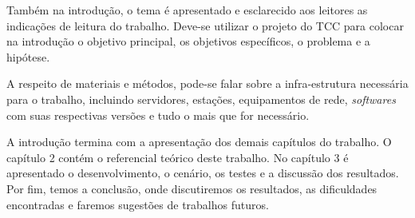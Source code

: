 Também na introdução, o tema é apresentado e esclarecido aos leitores as indicações de leitura do trabalho. Deve-se utilizar o projeto do TCC para colocar na introdução o objetivo principal, os objetivos específicos, o problema e a hipótese.

A respeito de materiais e métodos, pode-se falar sobre a infra-estrutura necessária para o trabalho, incluindo servidores, estações, equipamentos de rede, \emph{softwares} com suas respectivas versões e tudo o mais que for necessário.

A introdução termina com a apresentação dos demais capítulos do trabalho. O capítulo 2 contém o referencial teórico deste trabalho. No capítulo 3 é apresentado o desenvolvimento, o cenário, os testes e a discussão dos resultados. Por fim, temos a conclusão, onde discutiremos os resultados, as dificuldades encontradas e faremos sugestões de trabalhos futuros.